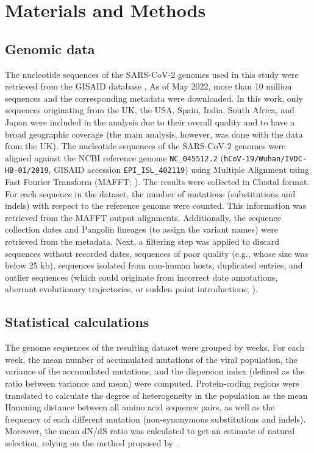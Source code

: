 \section{Materials and Methods}
\subsection{Genomic data}
The nucleotide sequences of the SARS-CoV-2 genomes used in this study were retrieved from the GISAID database \cite{khare2021gisaid}. As of May 2022, more than 10 million sequences and the corresponding metadata were downloaded. In this work, only sequences originating from the UK, the USA, Spain, India, South Africa, and Japan were included in the analysis due to their overall quality and to have a broad geographic coverage (the main analysis, however, was done with the data from the UK). The nucleotide sequences of the SARS-CoV-2 genomes were aligned against the NCBI reference genome \texttt{NC\_045512.2} (\texttt{hCoV-19/Wuhan/IVDC-HB-01/2019}, GISAID accession \texttt{EPI\_ISL\_402119}) using Multiple Alignment using Fast Fourier Transform (MAFFT; \cite{katoh2002mafft}). The results were collected in Clustal format. For each sequence in the dataset, the number of mutations (substitutions and indels) with respect to the reference genome were counted. This information was retrieved from the MAFFT output alignments. Additionally, the sequence collection dates and Pangolin lineages (to assign the variant names) were retrieved from the metadata. Next, a filtering step was applied to discard sequences without recorded dates, sequences of poor quality (e.g., whose size was below 25 kb), sequences isolated from non-human hosts, duplicated entries, and outlier sequences (which could originate from incorrect date annotations, aberrant evolutionary trajectories, or sudden point introductions; \cite{goiriz2023variant}). 

\subsection{Statistical calculations}

The genome sequences of the resulting dataset were grouped by weeks. For each week, the mean number of accumulated mutations of the viral population, the variance of the accumulated mutations, and the dispersion index (defined as the ratio between variance and mean) were computed. Protein-coding regions were translated to calculate the degree of heterogeneity in the population as the mean Hamming distance between all amino acid sequence pairs, as well as the frequency of each different mutation (non-synonymous substitutions and indels). Moreover, the mean dN/dS ratio was calculated to get an estimate of natural selection, relying on the method proposed by \cite{goldman1994codon}.

